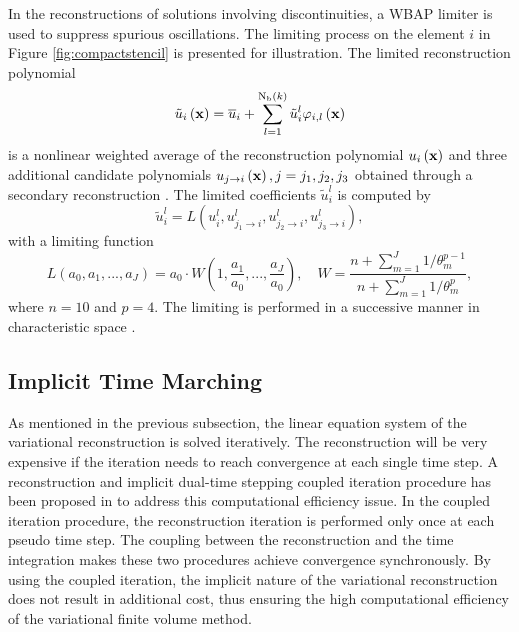 In the reconstructions of solutions involving discontinuities, a WBAP limiter \cite{li2011multi,li2012multi} is used to suppress spurious oscillations. The limiting process on the element $i$ in Figure \ref{fig:compactstencil} is presented for illustration. The limited reconstruction polynomial
\begin{equation}\label{eqn:Limited_Polynomial}
    \tilde{u}_{i} \left(\mathbf{x}\right) = \overline{u}_{i} + \sum_{l=1}^{\mathrm{N_b}\left(k\right)} \tilde{u}_i^l \varphi_{i,l}  \left(\mathbf{x}\right)
\end{equation}
is a nonlinear weighted average of the reconstruction polynomial $u_i \left(\mathbf{x}\right)$ and three additional candidate polynomials $u_{j \rightarrow i} \left(\mathbf{x}\right), j=j_1, j_2, j_3$ obtained through a secondary reconstruction \cite{li2012high}. The limited coefficients $\tilde{u}^l_i$ is computed by
\begin{equation}\label{eq:Limiting}
    \tilde{u}_i^l= L\left(u_i^l, u^l_{j_1 \rightarrow i}, u^l_{j_2 \rightarrow i}, u^l_{j_3 \rightarrow i}\right),
\end{equation}
with a limiting function
\begin{equation}
    L(a_0,a_1,...,a_J)=a_0\cdot{W\left(1,\frac{a_1}{a_0},...,\frac{a_J}{a_0}\right)}, \quad W=\frac{n+\sum_{m=1}^{J}{1/\theta_m^{p-1}}}{n+\sum_{m=1}^{J}{1/\theta_m^{p}}},
\end{equation}
where $n=10$ and $p=4$. The limiting is performed in a successive manner in characteristic space \cite{li2012multi}.

\subsection{Implicit Time Marching}
\label{ssec:TimeMarching}

As mentioned in the previous subsection, the linear equation system of the variational reconstruction is solved iteratively. The reconstruction will be very expensive if the iteration needs to reach convergence at each single time step. A reconstruction and implicit dual-time stepping coupled iteration procedure has been proposed in \cite{wang2016compact1_VR} to address this computational efficiency issue. In the coupled iteration procedure, the reconstruction iteration is performed only once at each pseudo time step. The coupling between the reconstruction and the time integration makes these two procedures achieve convergence synchronously. By using the coupled iteration, the implicit nature of the variational reconstruction does not result in additional cost, thus ensuring the high computational efficiency of the variational finite volume method.

